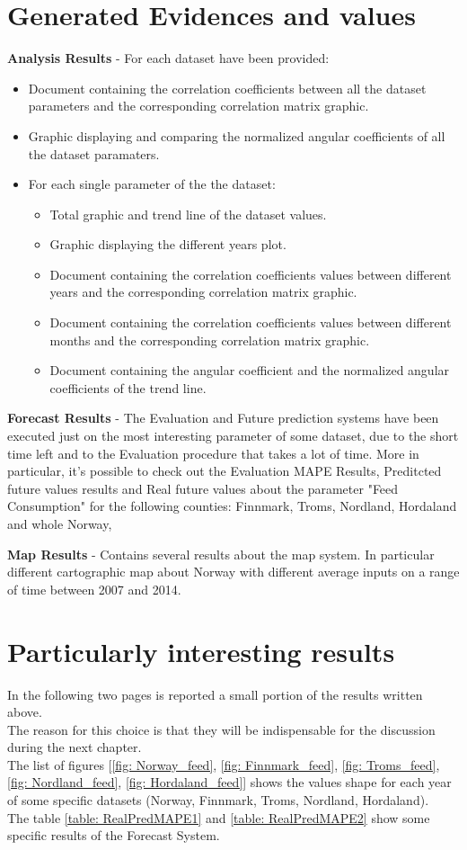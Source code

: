 \section{Generated Evidences and values}
\textbf{Analysis Results} - For each dataset have been provided:
\vspace{-5mm}
\begin{itemize}
 \item Document containing the correlation coefficients between all the dataset parameters and the corresponding correlation matrix graphic.
 \item Graphic displaying and comparing the normalized angular coefficients of all the dataset paramaters.
 \item For each single parameter of the the dataset:
\begin{itemize}
\item Total graphic and trend line of the dataset values.
\item Graphic displaying the different years plot.
\item Document containing the correlation coefficients values between different years and the corresponding correlation matrix graphic.
\item Document containing the correlation coefficients values between different months and the corresponding correlation matrix graphic.
\item Document containing the angular coefficient and the normalized angular coefficients of the trend line.
\end{itemize}
\end{itemize}

\textbf{Forecast Results} - The Evaluation and Future prediction systems have been executed just on the most interesting parameter of some dataset, due to the short time left and to the Evaluation procedure that takes a lot of time. More in particular, it's possible to check out the Evaluation MAPE Results, Preditcted future values results and Real future values about the parameter "Feed Consumption" for the following counties: Finnmark, Troms, Nordland, Hordaland and whole Norway,

\textbf{Map Results} - Contains several results about the map system. In particular different cartographic map about Norway with different average inputs on a range of time between 2007 and 2014.
		
\section{Particularly interesting results}
In the following two pages is reported a small portion of the results written above. \\
The reason for this choice is that they will be indispensable for the discussion during the next chapter. \\
The list of figures [\ref{fig: Norway_feed}, \ref{fig: Finnmark_feed}, \ref{fig: Troms_feed}, \ref{fig: Nordland_feed}, \ref{fig: Hordaland_feed}] shows the values shape for each year of some specific datasets (Norway, Finnmark, Troms, Nordland, Hordaland).\\
The table \ref{table: RealPredMAPE1} and \ref{table: RealPredMAPE2} show some specific results of the Forecast System.

